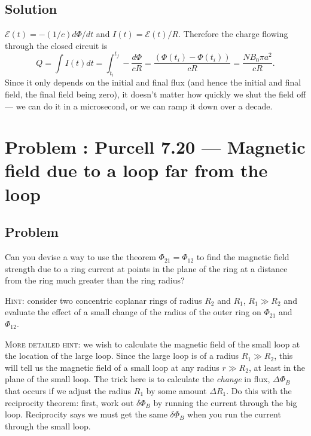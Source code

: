 \documentclass[solutions]{esg8022pset}
\begin{document}
\subsection{Solution}
  ${\mathcal{E}}(t) = -(1/c)d\Phi/dt$ and $I(t) =
  {\mathcal{E}}(t)/R$.  Therefore the charge flowing through the closed
  circuit is
  \begin{equation}
    Q=\int I(t)dt=\int_{t_{i}}^{t_{f}} -\frac{d\Phi}{cR}
    = \frac{(\Phi(t_{i}) - \Phi(t_{i}))
    }{cR}=\frac{NB_0\pi a^2}{cR}.
  \end{equation}
  Since it only depends on the initial and final flux (and hence the
  initial and final field, the final field being zero), it doesn't matter how quickly we shut the
  field off --- we can do it in a microsecond, or we can ramp it down
  over a decade.
\section{Problem \thesection: Purcell 7.20 --- Magnetic field due to a loop far from the loop}
\subsection{Problem}
  Can you devise a way to use the theorem $\Phi_{21}=\Phi_{12}$ to find the magnetic
  field strength due to a ring current at points in the plane of the ring at a distance from the ring much greater than the ring radius?

  \noindent \textsc{Hint}: consider two concentric coplanar rings of radius $R_{2}$ and $R_{1}$, $R_{1}\gg R_{2}$ and evaluate the effect of a small change
  of the radius of the outer ring on $\Phi_{21}$ and $\Phi_{12}$.

  \noindent \textsc{More detailed hint}:  we wish to calculate
  the magnetic field of the small loop at the location of the large
  loop.  Since the large loop is of a radius $R_1 \gg R_2$, this will
  tell us the magnetic field of a small loop at any radius $r \gg R_2$,
  at least in the plane of the small loop. The trick here is to calculate the {\it change} in
  flux, $\Delta\Phi_B$ that occurs if we adjust the radius $R_1$ by
  some amount $\Delta R_1$.  Do this with the reciprocity theorem:
  first, work out $\delta\Phi_B$ by running the current through the big
  loop.  Reciprocity says we must get the same
  $\delta\Phi_B$ when you run the current through the small loop.
\end{document}
